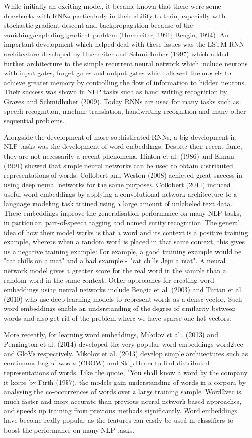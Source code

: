 \documentclass[conference]{IEEEtran}
\begin{document}
While initially an exciting model, it became known that there were some drawbacks with RNNs particularly in their ability to train, especially with stochastic gradient descent and backpropagation because of the vanishing/exploding gradient problem (Hochreiter, 1991; Bengio, 1994). An important development which helped deal with these issues was the LSTM RNN architecture developed by Hochreiter and Schmidhuber (1997) which added further architecture to the simple recurrent neural network which include neurons with input gates, forget gates and output gates which allowed the models to achieve greater memory by controlling the flow of information to hidden neurons. Their success was shown in NLP tasks such as hand writing recognition by Graves and Schmidhuber (2009). Today RNNs are used for many tasks such as speech recognition, machine translation, handwriting recognition and many other sequential problems.

Alongside the development of more sophisticated RNNs, a big development in NLP tasks was the development of word embeddings. Despite their recent fame, they are not necessarily a recent phenomena. Hinton et al. (1986) and Elman (1991) showed that simple neural networks can be used to obtain distributed representations of words. Collobert and Weston (2008) achieved great success in using deep neural networks for the same purposes. Collobert (2011) induced useful word embeddings by applying a convolutional network architecture to a language modeling task trained using a large amount of unlabeled text data. These embeddings improve the generalisation performance on many NLP tasks, in particular, part-of-speech tagging and named entity recognition. The general idea of how their model works is that a word and its context is a positive training example, whereas when a random word is placed in that same context, this gives us a negative training example: For example, a good training example would be "cat chills on a mat" and a bad example - "cat chills Jeju a mat". A neural network model gives a greater score for the real word in the sample than a random word in the same context. Other approaches for creating word embeddings using neural networks include Bengio et al. (2003) and  Turian et al. (2010) who  use deep learning models to represent words as a dense vector. Such word embeddings enable an understanding of the degree of similarity between words and also get rid of the problem where we have sparse one-hot vectors. 

More recently, for learning word embeddings, Mikolov et al., (2013) and Pennington et al. (2014) developed the very popular word embeddings word2vec and GloVe respectively. Mikolov et al. (2013) develop simple architectures such as continuous-bag-of-words (CBOW) and Skip-Hram to find distributed representations of words. Like the quote, "You shall know a word by the company it keeps by Firth (1957), the models gain understanding of words in a corpora by analysing the co-occurrences of words over a large training sample. Word2vec is much faster and more accurate than previous neural network based approaches, and speeds up training from previous methods significantly. Word embeddings have become really popular as the  features can easily be used in classifiers to boost the performance on many NLP tasks.
\end{document}
